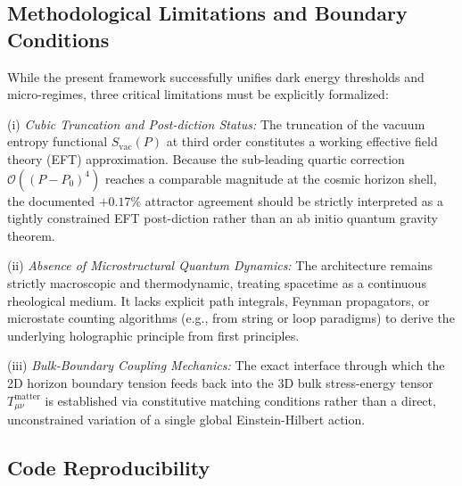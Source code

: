 \documentclass[prd,
               reprint,
               aps,
               preprintnumbers,
               nofootinbib,
               longbibliography,
               floatfix]{revtex4-2}
\begin{document}
\subsection{Methodological Limitations and Boundary Conditions}

While the present framework successfully unifies dark energy thresholds 
and micro-regimes, three critical limitations must be explicitly 
formalized:

(i) \emph{Cubic Truncation and Post-diction Status:} The truncation of 
the vacuum entropy functional $S_{\text{vac}}(P)$ at third order 
constitutes a working effective field theory (EFT) approximation. Because 
the sub-leading quartic correction $\mathcal{O}((P-P_0)^4)$ reaches a 
comparable magnitude at the cosmic horizon shell, the documented $+0.17\%$ 
attractor agreement should be strictly interpreted as a tightly constrained 
EFT post-diction rather than an ab initio quantum gravity theorem.

(ii) \emph{Absence of Microstructural Quantum Dynamics:} The architecture 
remains strictly macroscopic and thermodynamic, treating spacetime as a 
continuous rheological medium. It lacks explicit path integrals, Feynman 
propagators, or microstate counting algorithms (e.g., from string or loop 
paradigms) to derive the underlying holographic principle from first principles.

(iii) \emph{Bulk-Boundary Coupling Mechanics:} The exact interface through 
which the 2D horizon boundary tension feeds back into the 3D bulk 
stress-energy tensor $T_{\mu\nu}^{\text{matter}}$ is established via 
constitutive matching conditions rather than a direct, unconstrained 
variation of a single global Einstein-Hilbert action.



\subsection{Code Reproducibility}
\label{sec:reproducibility_prd}
\end{document}
